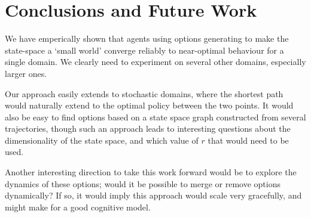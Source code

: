 \section{Conclusions and Future Work}
\label{sec:conclusions}

We have emperically shown that agents using options generating to make the
state-space a `small world' converge reliably to near-optimal behaviour for a
single domain. We clearly need to experiment on several other domains,
especially larger ones.

Our approach easily extends to stochastic domains, where the shortest path would
naturally extend to the optimal policy between the two points. It would also be
easy to find options based on a state space graph constructed from several
trajectories, though such an approach leads to interesting questions about the
dimensionality of the state space, and which value of $r$ that would need to be
used.

Another interesting direction to take this work forward would be to explore the
dynamics of these options; would it be possible to merge or remove options
dynamically? If so, it would imply this approach would scale very gracefully,
and might make for a good cognitive model.


